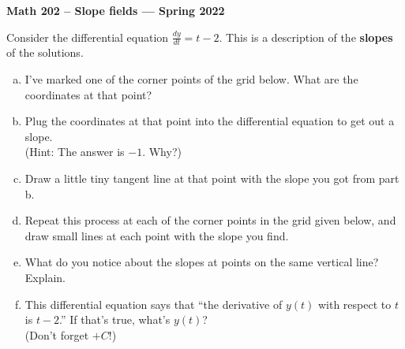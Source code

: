 \documentclass[12pt]{article}
\begin{document}
\begin{center}
  \textbf{ Math 202 -- Slope fields 
  --- Spring 2022
    }
\end{center}

Consider the differential equation $\frac{dy}{dt} = t-2$. This is a description of the \textbf{slopes} of the solutions.
\begin{enumerate}[a.]
\item I've marked one of the corner points of the grid below. What are the coordinates at that point? 
\item Plug the coordinates at that point into the differential equation to get out a slope. \\
(Hint: The answer is $-1$. Why?)
\item Draw a little tiny tangent line at that point with the slope you got from part b.
\item Repeat this process at each of the corner points 
in the grid given below,
and draw small lines at each point with the slope you find. %
\item What do you notice about the slopes at points on the same vertical line? 
Explain.
\begin{center}
\end{center}
\item This differential equation says that ``the derivative of $y(t)$ with respect to $t$ is $t-2$.'' If that's true, what's $y(t)$? \\
(Don't forget $+C$!)

\end{enumerate}
\end{document}
